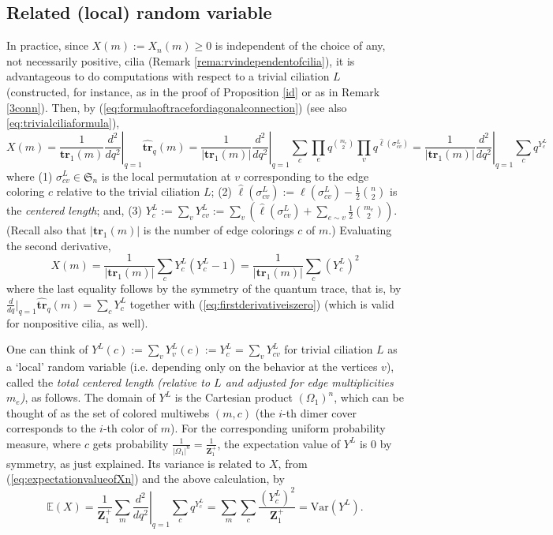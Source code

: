 \documentclass[12pt, reqno]{amsart}
\theoremstyle{definition}
\renewcommand{\hat}{\widehat}
\newcommand{\E}{\mathbb{E}}%
\newcommand{\htrq}{\hat{\mathbf{tr}}_q}%
\begin{document}
\subsection{Related (local) random variable}\label{sssec:localrv}

In practice, since $X(m):=X_n(m)\geq0$ is independent of the choice of any, not necessarily positive, cilia (Remark \ref{rema:rvindependentofcilia}), it is advantageous to do computations with respect to a trivial ciliation $L$ (constructed, for instance, as in the proof of Proposition \ref{id} or as in Remark \ref{3conn}).  Then, by (\ref{eq:formulaoftracefordiagonalconnection}) (see also \ref{eq:trivialciliaformula}),
$$
X(m)
=\frac{1}{\mathbf{tr}_1(m)}\left.\frac{d^2}{dq^2}\right|_{q=1}\htrq(m)
=\frac{1}{|\mathbf{tr}_1(m)|}\left.\frac{d^2}{dq^2}\right|_{q=1}\sum_c\prod_{e}q^{\binom{m_e}{2}}\prod_v q^{\hat{\ell}(\sigma_{cv}^L)}
=\frac{1}{|\mathbf{tr}_1(m)|}\left.\frac{d^2}{dq^2}\right|_{q=1}\sum_c q^{Y_c^L}
$$
where (1) $\sigma_{cv}^L\in\mathfrak{S}_n$ is the local permutation at $v$ corresponding to the edge coloring $c$ relative to the trivial ciliation $L$; (2) $\hat{\ell}(\sigma_{cv}^L):=\ell(\sigma_{cv}^L)-\frac{1}{2}\binom{n}{2}$ is the \emph{centered length}; and, (3) $Y_c^L:=\sum_v Y_{cv}^L:=\sum_v(\hat{\ell}(\sigma_{cv}^L)+\sum_{e\sim v}\frac{1}{2}\binom{m_e}{2})$.  (Recall also that $|\mathbf{tr}_1(m)|$ is the number of edge colorings $c$ of $m$.)  Evaluating the second derivative, 
$$
X(m)
=\frac{1}{|\mathbf{tr}_1(m)|}\sum_c Y_c^L(Y_c^L-1)
=\frac{1}{|\mathbf{tr}_1(m)|}\sum_c (Y_c^L)^2
$$
where the last equality follows by the symmetry of the quantum trace, that is, by $\frac{d}{dq}|_{q=1}\htrq(m)=\sum_c Y_c^L$ together with (\ref{eq:firstderivativeiszero}) (which is valid for nonpositive cilia, as well).  

One can think of $Y^L(c):=\sum_v Y^L_v(c):=Y_c^L=\sum_v Y_{cv}^L$ for trivial ciliation $L$ as a `local' random variable (i.e. depending only on the behavior at the vertices $v$), called the \emph{total centered length (relative to $L$ and adjusted for edge multiplicities $m_e$)}, as follows.  The domain of $Y^L$ is the Cartesian product $(\Omega_1)^n$, which can be thought of as the set of colored multiwebs $(m,c)$ (the $i$-th dimer cover corresponds to the $i$-th color of $m$).  For the corresponding uniform probability measure, where $c$ gets probability $\frac{1}{|\Omega_1|^n}=\frac{1}{\mathbf{Z}_1^+}$, the expectation value of $Y^L$ is $0$ by symmetry, as just explained.  Its variance is related to $X$, from (\ref{eq:expectationvalueofXn}) and the above calculation, by
$$
\E(X)
=\frac{1}{\mathbf{Z}_1^+}\sum_m\left.\frac{d^2}{dq^2}\right|_{q=1}\sum_c q^{Y_c^L}
=\sum_m\sum_c \frac{(Y_c^L)^2}{\mathbf{Z}_1^+}
=\mathrm{Var}(Y^L).
$$
\end{document}
